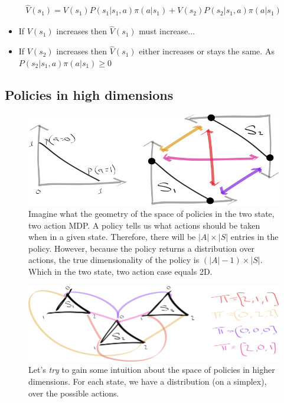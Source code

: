 \begin{align}
\hat V(s_1) = V(s_1)P(s_1|s_1, a)\pi(a|s_1) + V(s_2)P(s_2|s_1, a)\pi(a|s_1)
\end{align}

\begin{itemize}
\tightlist
\item
If $V(s_1)$ increases then $\hat V(s_1)$ must increase...
\item
If $V(s_2)$ increases then $\hat V(s_1)$  either increases or stays the same. As $P(s_2|s_1, a)\pi(a|s_1) \ge 0$
\end{itemize}

\subsection{Policies in high dimensions}



\begin{figure}
\centering
\includegraphics[width=1\textwidth,height=0.25\textheight]{../../pictures/drawings/2-state-2-action-simplices.png}
\caption{Imagine what the geometry of the space of policies in the two state, two action MDP. A policy tells us what actions should be taken when in a given state. Therefore, there will be \(|A| \times |S|\) entries in the policy. However, because the policy returns a distribution over actions, the true dimensionality of the policy is \((|A| -1) \times |S|\). Which in the two state, two action case equals 2D.}
\end{figure}

\begin{figure}
\centering
\includegraphics[width=1\textwidth,height=0.25\textheight]{../../pictures/drawings/3-state-3-action-simplices.png}
\caption{Let's \textit{try} to gain some intuition about the space of policies in higher dimensions.
For each state, we have a distribution (on a simplex), over the possible actions.}
\end{figure}

